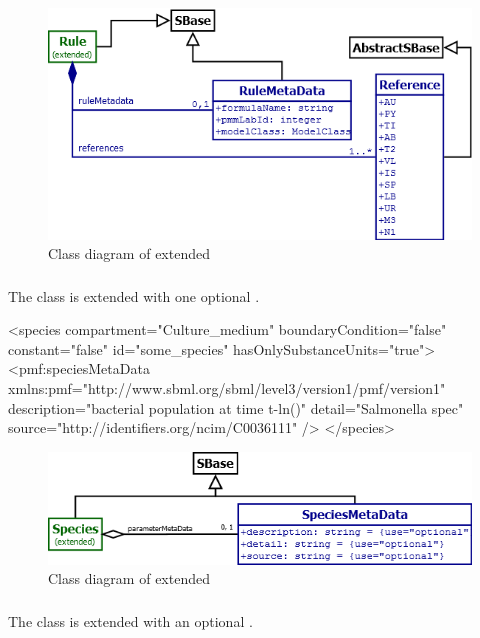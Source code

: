 \begin{figure}
	\includegraphics[scale=0.7]{img/rule_uml}
	\caption{Class diagram of extended \Rule}
	\label{rule_uml}
\end{figure}

\subsubsection{}
The \Species class is extended with one optional \SpeciesMetaData.
\begin{example}
<species compartment="Culture_medium" boundaryCondition="false" constant="false"
  id="some_species" hasOnlySubstanceUnits="true">
  <pmf:speciesMetaData xmlns:pmf="http://www.sbml.org/sbml/level3/version1/pmf/version1"
    description="bacterial population at time t-ln()" detail="Salmonella spec"
    source="http://identifiers.org/ncim/C0036111" />
</species>
\end{example}

\begin{figure}
	\includegraphics[scale=0.7]{img/species_uml}
	\caption{Class diagram of extended \Species}
	\label{species_uml}
\end{figure}

\subsubsection{}
The \UnitTransformation class is extended with an optional \UnitTransformation.

